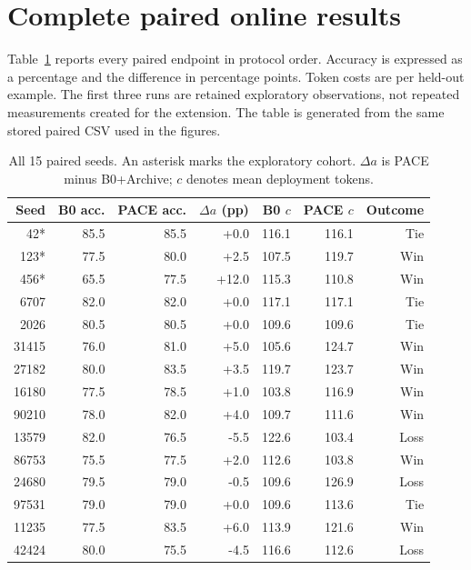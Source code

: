 \section{Complete paired online results}
\label{app:paired}
Table~\ref{tab:all-seeds} reports every paired endpoint in protocol order.
Accuracy is expressed as a percentage and the difference in percentage points.
Token costs are per held-out example. The first three runs are retained
exploratory observations, not repeated measurements created for the extension.
The table is generated from the same stored paired CSV used in the figures.

\begin{table}[htbp]\centering\small
\caption{All 15 paired seeds. An asterisk marks the exploratory cohort.
$\Delta a$ is PACE minus B0+Archive; $c$ denotes mean deployment tokens.}
\label{tab:all-seeds}
\begin{tabular}{@{}rrrrrrr@{}}\toprule
Seed & B0 acc. & PACE acc. & $\Delta a$ (pp) & B0 $c$ & PACE $c$ & Outcome\\\midrule
42* & 85.5 & 85.5 & +0.0 & 116.1 & 116.1 & Tie\\
123* & 77.5 & 80.0 & +2.5 & 107.5 & 119.7 & Win\\
456* & 65.5 & 77.5 & +12.0 & 115.3 & 110.8 & Win\\
6707 & 82.0 & 82.0 & +0.0 & 117.1 & 117.1 & Tie\\
2026 & 80.5 & 80.5 & +0.0 & 109.6 & 109.6 & Tie\\
31415 & 76.0 & 81.0 & +5.0 & 105.6 & 124.7 & Win\\
27182 & 80.0 & 83.5 & +3.5 & 119.7 & 123.7 & Win\\
16180 & 77.5 & 78.5 & +1.0 & 103.8 & 116.9 & Win\\
90210 & 78.0 & 82.0 & +4.0 & 109.7 & 111.6 & Win\\
13579 & 82.0 & 76.5 & -5.5 & 122.6 & 103.4 & Loss\\
86753 & 75.5 & 77.5 & +2.0 & 112.6 & 103.8 & Win\\
24680 & 79.5 & 79.0 & -0.5 & 109.6 & 126.9 & Loss\\
97531 & 79.0 & 79.0 & +0.0 & 109.6 & 113.6 & Tie\\
11235 & 77.5 & 83.5 & +6.0 & 113.9 & 121.6 & Win\\
42424 & 80.0 & 75.5 & -4.5 & 116.6 & 112.6 & Loss\\
\bottomrule\end{tabular}\end{table}

